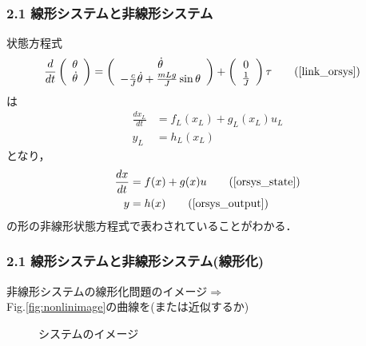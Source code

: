 \begin{frame}[t]
\frametitle{2.1 線形システムと非線形システム}
状態方程式
\begin{align}
	\frac{d}{dt} \left(\begin{array}{c} 
			\theta \\ 
			\dot{\theta} 
		      \end{array}\right)
			&=  \left(\begin{array}{c}
				\dot{\theta} \\
				- \frac{c}{J} \dot{\theta}
				+ \frac{m L g}{J} \sin \theta 
 			      \end{array}\right)
				+ \left(\begin{array}{c}
					0 \\
					\frac{1}{J}
				  \end{array}\right)
				  \tau
	\tag{\ref{link_orsys}}
\end{align}
は
\begin{align}
\frac{dx_L}{dt} &= f_L(x_L) + g_L(x_L) u_L 
\\
	y_L &= h_L(x_L)
\label{link_state}
\end{align}
となり，
\begin{align}
 \frac{dx}{dt} &= f(x) + g(x) u \tag{\ref{orsys_state}} \\
 y             &= h(x) \tag{\ref{orsys_output}}
\end{align}
の形の非線形状態方程式で表わされていることがわかる．
\end{frame}

\begin{frame}[t]
\frametitle{2.1 線形システムと非線形システム(線形化)}
非線形システムの線形化問題のイメージ$\Longrightarrow$\\
Fig.\ref{fig:nonlinimage}の曲線を(または近似するか)

\begin{figure}[htbp]
 \renewcommand{\subcapsize}{\normalsize}
 \def\subfigcapskip{0pt}
  \begin{center}
     \hspace{5mm}
   \caption{システムのイメージ}
  \end{center}
\end{figure}
\end{frame}

